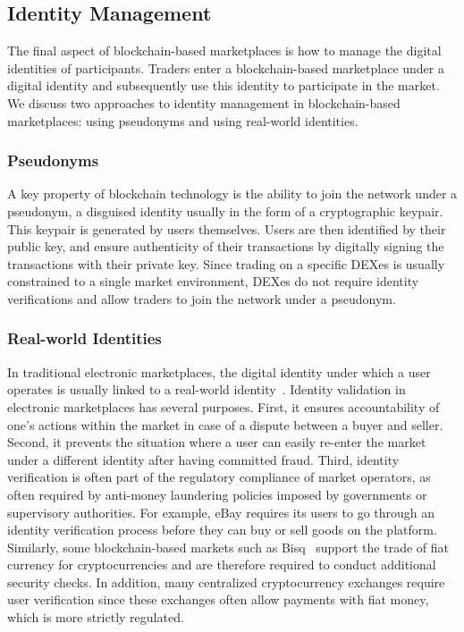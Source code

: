 \subsection{Identity Management}
The final aspect of blockchain-based marketplaces is how to manage the digital identities of participants.
Traders enter a blockchain-based marketplace under a digital identity and subsequently use this identity to participate in the market.
We discuss two approaches to identity management in blockchain-based marketplaces: using pseudonyms and using real-world identities.

\subsubsection{Pseudonyms}
A key property of blockchain technology is the ability to join the network under a pseudonym, a disguised identity usually in the form of a cryptographic keypair.
This keypair is generated by users themselves.
Users are then identified by their public key, and ensure authenticity of their transactions by digitally signing the transactions with their private key.
Since trading on a specific DEXes is usually constrained to a single market environment, DEXes do not require identity verifications and allow traders to join the network under a pseudonym.

\subsubsection{Real-world Identities}
In traditional electronic marketplaces, the digital identity under which a user operates is usually linked to a real-world identity~\cite{subramanian2017decentralized}.
Identity validation in electronic marketplaces has several purposes.
First, it ensures accountability of one's actions within the market in case of a dispute between a buyer and seller.
Second, it prevents the situation where a user can easily re-enter the market under a different identity after having committed fraud.
Third, identity verification is often part of the regulatory compliance of market operators, as often required by anti-money laundering policies imposed by governments or supervisory authorities.
For example, eBay requires its users to go through an identity verification process before they can buy or sell goods on the platform.
Similarly, some blockchain-based markets such as Bisq~\cite{bisq} support the trade of fiat currency for cryptocurrencies and are therefore required to conduct additional security checks.
In addition, many centralized cryptocurrency exchanges require user verification since these exchanges often allow payments with fiat money, which is more strictly regulated.

